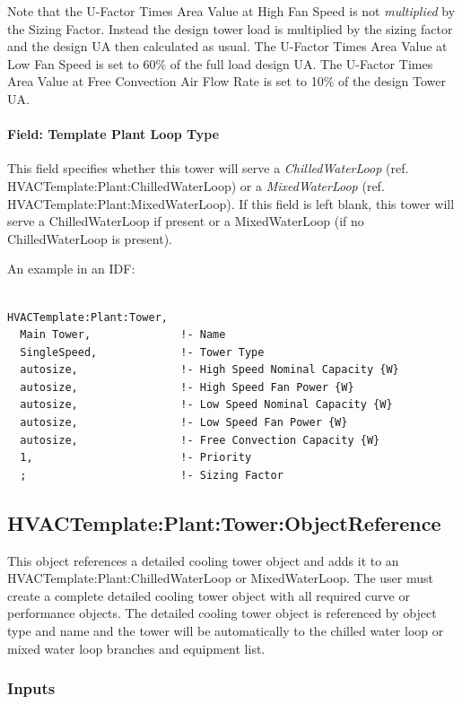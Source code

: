 Note that the U-Factor Times Area Value at High Fan Speed is not \emph{multiplied} by the Sizing Factor. Instead the design tower load is multiplied by the sizing factor and the design UA then calculated as usual. The U-Factor Times Area Value at Low Fan Speed is set to 60\% of the full load design UA. The U-Factor Times Area Value at Free Convection Air Flow Rate is set to 10\% of the design Tower UA.

\paragraph{Field: Template Plant Loop Type}\label{field-template-plant-loop-type}

This field specifies whether this tower will serve a \emph{ChilledWaterLoop} (ref. HVACTemplate:Plant:ChilledWaterLoop) or a \emph{MixedWaterLoop} (ref. HVACTemplate:Plant:MixedWaterLoop). If this field is left blank, this tower will serve a ChilledWaterLoop if present or a MixedWaterLoop (if no ChilledWaterLoop is present).

An example in an IDF:

\begin{lstlisting}

HVACTemplate:Plant:Tower,
  Main Tower,              !- Name
  SingleSpeed,             !- Tower Type
  autosize,                !- High Speed Nominal Capacity {W}
  autosize,                !- High Speed Fan Power {W}
  autosize,                !- Low Speed Nominal Capacity {W}
  autosize,                !- Low Speed Fan Power {W}
  autosize,                !- Free Convection Capacity {W}
  1,                       !- Priority
  ;                        !- Sizing Factor
\end{lstlisting}

\subsection{HVACTemplate:Plant:Tower:ObjectReference}\label{hvactemplateplanttowerobjectreference}

This object references a detailed cooling tower object and adds it to an HVACTemplate:Plant:ChilledWaterLoop or MixedWaterLoop. The user must create a complete detailed cooling tower object with all required curve or performance objects. The detailed cooling tower object is referenced by object type and name and the tower will be automatically to the chilled water loop or mixed water loop branches and equipment list.

\subsubsection{Inputs}\label{inputs-27-000}

